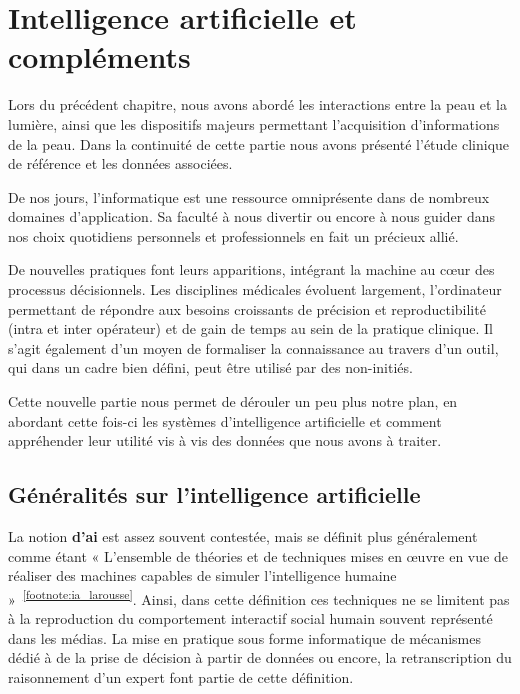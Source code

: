 \chapter{Intelligence artificielle et compléments}
\label{chap:chapter_3}
\chapterintro
Lors du précédent chapitre, nous avons abordé les interactions entre la peau et la lumière, ainsi que les dispositifs majeurs permettant l'acquisition d'informations de la peau. Dans la continuité de cette partie nous avons présenté l'étude clinique de référence et les données associées.\par

De nos jours, l’informatique est une ressource omniprésente dans de nombreux domaines d’application. Sa faculté à nous divertir ou encore à nous guider dans nos choix quotidiens personnels et professionnels en fait un précieux allié.\par 

De nouvelles pratiques font leurs apparitions, intégrant la machine au cœur des processus décisionnels. Les disciplines médicales évoluent largement, l’ordinateur permettant de répondre aux besoins croissants de précision et reproductibilité (intra et inter opérateur) et de gain de temps au sein de la pratique clinique. Il s’agit également d’un moyen de formaliser la connaissance au travers d’un outil, qui dans un cadre bien défini, peut être utilisé par des non-initiés.\par

Cette nouvelle partie nous permet de dérouler un peu plus notre plan, en abordant cette fois-ci les systèmes d'intelligence artificielle et comment appréhender leur utilité vis à vis des données que nous avons à traiter.\par
\newpage

\section{Généralités sur l'intelligence artificielle}
La notion \textbf{d’\gls{ai}} est assez souvent contestée, mais se définit plus généralement comme étant « L’ensemble de théories et de techniques mises en œuvre en vue de réaliser des machines capables de simuler l'intelligence humaine »~\textsuperscript{\ref{footnote:ia_larousse}}. Ainsi, dans cette définition ces techniques ne se limitent pas à la reproduction du comportement interactif social humain souvent représenté dans les médias. La mise en pratique sous forme informatique de mécanismes dédié à de la prise de décision à partir de données ou encore, la retranscription du raisonnement d'un expert font partie de cette définition.\par

